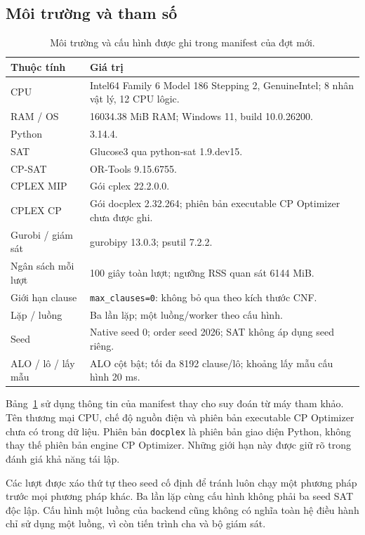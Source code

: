 \subsection{Môi trường và tham số}
\begin{table}[pos=H]\centering\small
\caption{Môi trường và cấu hình được ghi trong manifest của đợt mới.}
\label{tab:environment}
\begin{tabular}{@{}p{.27\linewidth}p{.66\linewidth}@{}}\toprule
Thuộc tính & Giá trị\\\midrule
CPU & Intel64 Family 6 Model 186 Stepping 2, GenuineIntel; 8 nhân vật lý, 12 CPU lôgic.\\
RAM / OS & 16034.38 MiB RAM; Windows 11, build 10.0.26200.\\
Python & 3.14.4.\\
SAT & Glucose3 qua python-sat 1.9.dev15.\\
CP-SAT & OR-Tools 9.15.6755.\\
CPLEX MIP & Gói cplex 22.2.0.0.\\
CPLEX CP & Gói docplex 2.32.264; phiên bản executable CP Optimizer chưa được ghi.\\
Gurobi / giám sát & gurobipy 13.0.3; psutil 7.2.2.\\
Ngân sách mỗi lượt & 100 giây toàn lượt; ngưỡng RSS quan sát 6144 MiB.\\
Giới hạn clause & \texttt{max\_clauses=0}: không bỏ qua theo kích thước CNF.\\
Lặp / luồng & Ba lần lặp; một luồng/worker theo cấu hình.\\
Seed & Native seed 0; order seed 2026; SAT không áp dụng seed riêng.\\
ALO / lô / lấy mẫu & ALO cột bật; tối đa 8192 clause/lô; khoảng lấy mẫu cấu hình 20 ms.\\
\bottomrule\end{tabular}
\end{table}
Bảng~\ref{tab:environment} sử dụng thông tin của manifest thay cho suy đoán từ máy tham khảo. Tên thương mại CPU, chế độ nguồn điện và phiên bản executable CP Optimizer chưa có trong dữ liệu. Phiên bản \texttt{docplex} là phiên bản giao diện Python, không thay thế phiên bản engine CP Optimizer. Những giới hạn này được giữ rõ trong đánh giá khả năng tái lập.

Các lượt được xáo thứ tự theo seed cố định để tránh luôn chạy một phương pháp trước mọi phương pháp khác. Ba lần lặp cùng cấu hình không phải ba seed SAT độc lập. Cấu hình một luồng của backend cũng không có nghĩa toàn hệ điều hành chỉ sử dụng một luồng, vì còn tiến trình cha và bộ giám sát.

